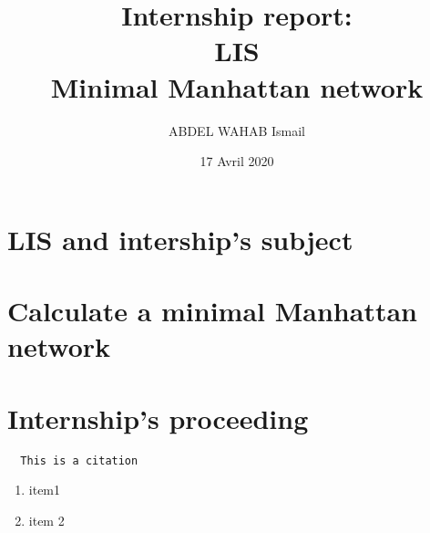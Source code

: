 \documentclass[11pt]{report}
\title{\textbf{Internship report: \\
			LIS\\  Minimal Manhattan network}}
\author{ABDEL WAHAB Ismail}
\date{17 Avril 2020}
\begin{document}
\maketitle
\thispagestyle{empty}
\renewcommand{\contentsname}{Summary}
\tableofcontents
\newpage

\iffalse --------------  Document Content-------------------------- \fi

\part{LIS and intership's subject}


\part{Calculate a minimal Manhattan network}



\part{Internship's proceeding}


\begin{quoting} \begin{verbatim}
  This is a citation
\end{verbatim} \end{quoting}

\begin{enumerate}
	\item{item1}
	\item{item 2}
\end{enumerate} 
\end{document}
